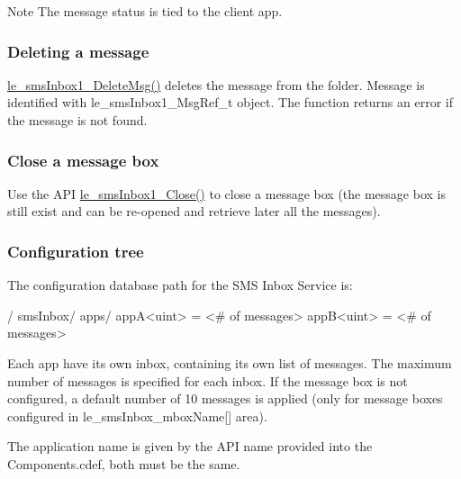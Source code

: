 \begin{DoxyNote}{Note}
The message status is tied to the client app.
\end{DoxyNote}
\hypertarget{c_sms_inbox_le_smsInbox1_deleting}{}\subsubsection{Deleting a message}\label{c_sms_inbox_le_smsInbox1_deleting}
\hyperlink{le__sms_inbox1__interface_8h_a2a426505848863678403f5b14c2ce16c}{le\+\_\+sms\+Inbox1\+\_\+\+Delete\+Msg()} deletes the message from the folder. Message is identified with le\+\_\+sms\+Inbox1\+\_\+\+Msg\+Ref\+\_\+t object. The function returns an error if the message is not found.\hypertarget{c_sms_inbox_le_smsInbox_end}{}\subsubsection{Close a message box}\label{c_sms_inbox_le_smsInbox_end}
Use the A\+P\+I \hyperlink{le__sms_inbox1__interface_8h_a2c3b0118016949b77df6bab31c3a986e}{le\+\_\+sms\+Inbox1\+\_\+\+Close()} to close a message box (the message box is still exist and can be re-\/opened and retrieve later all the messages).\hypertarget{c_sms_inbox_le_smsInbox_configdb}{}\subsubsection{Configuration tree}\label{c_sms_inbox_le_smsInbox_configdb}
The configuration database path for the S\+M\+S Inbox Service is\+: \begin{DoxyVerb}/
    smsInbox/
        apps/
            appA<uint> = <# of messages>
            appB<uint> = <# of messages>
\end{DoxyVerb}


Each app have its own inbox, containing its own list of messages. The maximum number of messages is specified for each inbox. If the message box is not configured, a default number of 10 messages is applied (only for message boxes configured in le\+\_\+sms\+Inbox\+\_\+mbox\+Name\mbox{[}\mbox{]} area).

The application name is given by the A\+P\+I name provided into the Components.\+cdef, both must be the same.






